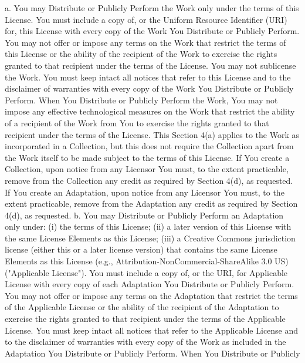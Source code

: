  a. You may Distribute or Publicly Perform the Work only under the terms
    of this License. You must include a copy of, or the Uniform Resource
    Identifier (URI) for, this License with every copy of the Work You
    Distribute or Publicly Perform. You may not offer or impose any terms
    on the Work that restrict the terms of this License or the ability of
    the recipient of the Work to exercise the rights granted to that
    recipient under the terms of the License. You may not sublicense the
    Work. You must keep intact all notices that refer to this License and
    to the disclaimer of warranties with every copy of the Work You
    Distribute or Publicly Perform. When You Distribute or Publicly
    Perform the Work, You may not impose any effective technological
    measures on the Work that restrict the ability of a recipient of the
    Work from You to exercise the rights granted to that recipient under
    the terms of the License. This Section 4(a) applies to the Work as
    incorporated in a Collection, but this does not require the Collection
    apart from the Work itself to be made subject to the terms of this
    License. If You create a Collection, upon notice from any Licensor You
    must, to the extent practicable, remove from the Collection any credit
    as required by Section 4(d), as requested. If You create an
    Adaptation, upon notice from any Licensor You must, to the extent
    practicable, remove from the Adaptation any credit as required by
    Section 4(d), as requested.
 b. You may Distribute or Publicly Perform an Adaptation only under: (i)
    the terms of this License; (ii) a later version of this License with
    the same License Elements as this License; (iii) a Creative Commons
    jurisdiction license (either this or a later license version) that
    contains the same License Elements as this License (e.g.,
    Attribution-NonCommercial-ShareAlike 3.0 US) ("Applicable License").
    You must include a copy of, or the URI, for Applicable License with
    every copy of each Adaptation You Distribute or Publicly Perform. You
    may not offer or impose any terms on the Adaptation that restrict the
    terms of the Applicable License or the ability of the recipient of the
    Adaptation to exercise the rights granted to that recipient under the
    terms of the Applicable License. You must keep intact all notices that
    refer to the Applicable License and to the disclaimer of warranties
    with every copy of the Work as included in the Adaptation You
    Distribute or Publicly Perform. When You Distribute or Publicly
